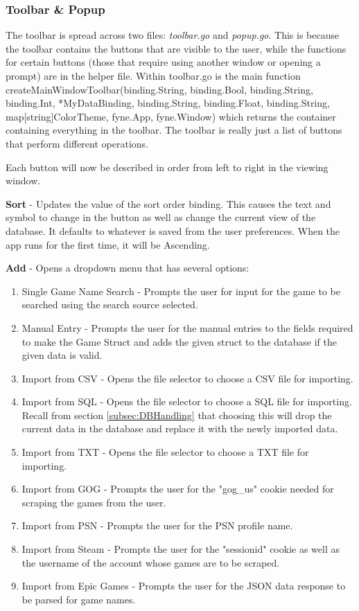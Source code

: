 \subsubsection{Toolbar \& Popup}
\label{subsubsec:ToolPop}

The toolbar is spread across two files: \textit{toolbar.go} and
\textit{popup.go}. This is because the toolbar contains the buttons
that are visible to the user, while the functions for certain buttons
(those that require using another window or opening a prompt) are in
the helper file.
Within toolbar.go is the main function
createMainWindowToolbar(binding.String, binding.Bool, binding.String,
	binding.Int, *MyDataBinding, binding.String, binding.Float,
binding.String, map[string]ColorTheme, fyne.App, fyne.Window) which
returns the container containing everything in the toolbar.
The toolbar is really just a list of buttons that perform different operations.

Each button will now be described in order from left to right in the
viewing window.

\textbf{Sort} - Updates the value of the sort order binding. This
causes the text and symbol to change in the button as
well as change the current view of the database. It defaults to
whatever is saved from the user preferences. When the app runs for
the first time, it will be Ascending.

\textbf{Add} - Opens a dropdown menu that has several options:
\begin{enumerate}
	\item Single Game Name Search - Prompts the user for input for the
		game to be searched using the search source selected.
	\item Manual Entry - Prompts the user for
		the manual entries to the fields required to make the Game Struct
		and adds the given struct to the database if the given data is valid.
	\item Import from CSV - Opens the file selector to choose a CSV file
		for importing.
	\item Import from SQL - Opens the file selector to choose a SQL file
		for importing. Recall from section \ref{subsec:DBHandling} that choosing
		this will drop the current data in the database and replace it with
		the newly imported data.
	\item Import from TXT - Opens the file selector to choose a TXT file
		for importing.
	\item Import from GOG - Prompts the user for the
		"gog\_us" cookie needed for scraping the games from the user.
	\item Import from PSN - Prompts the user for the PSN profile name.
	\item Import from Steam - Prompts the user for the "sessionid"
		cookie as well as the username of the account whose games are to be scraped.
	\item Import from Epic Games - Prompts the user for the JSON data
		response to be parsed for game names.
\end{enumerate}

